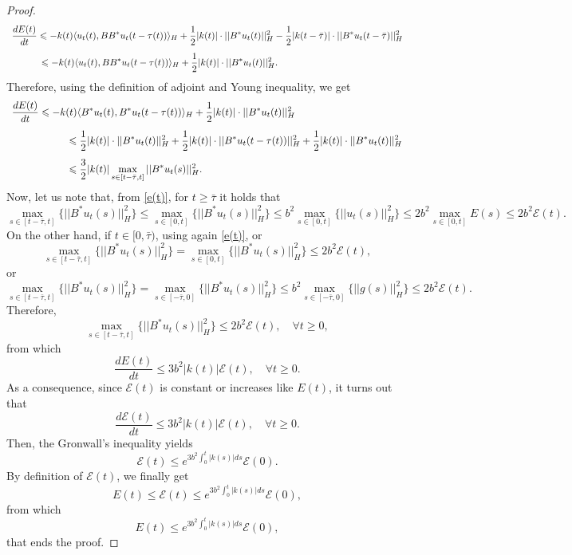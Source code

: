 \documentclass[11pt]{article}
\renewcommand{\geq}{\geqslant}
\renewcommand{\leq}{\leqslant}
\begin{document}
\begin{proof}
$$\begin{array}{l}
		\vspace{0.3cm}\displaystyle{\frac{dE(t)}{dt} \leq -k(t)\langle u_t(t),BB^*u_t(t-\tau(t))\rangle_H +\frac{1}{2}|k(t)| \cdot ||B^*u_t(t)||_H^2-\frac{1}{2}|k(t-\bar{\tau})|\cdot ||B^*u_t(t-\bar\tau)||_H^2}\\
		\displaystyle{\hspace{1.1cm}\leq -k(t)\langle u_t(t),BB^*u_t(t-\tau(t))\rangle_H +\frac{1}{2}|k(t)| \cdot ||B^*u_t(t)||_H^2.}
	\end{array}
	$$
	Therefore, using the definition of adjoint and Young inequality, we get
	$$
	\begin{array}{l}
		\vspace{0.3cm}\displaystyle{
			\frac{dE(t)}{dt}\leq-k(t)\langle B^*u_t(t),B^*u_t(t-\tau(t))\rangle_H +\frac{1}{2}|k(t)| \cdot ||B^*u_t(t)||_H^2}\\
		\vspace{0.3cm}\displaystyle{\hspace{2 cm}\leq \frac{1}{2}|k(t)\vert\cdot||B^*u_t(t)||_H^2 +\frac{1}{2}|k(t)\vert\cdot||B^*u_t(t-\tau(t))||_H^2+\frac{1}{2}|k(t)\vert\cdot||B^*u_t(t)||_H^2}\\
		\displaystyle{\hspace{2cm}\leq \frac{3}{2}|k(t)\vert \max_{s\in [t-\bar{\tau},t]}||B^*u_t(s)||_H^2.}
	\end{array}
	$$
	Now, let us note that, from \eqref{e(t)}, for $t\geq \bar{\tau}$ it holds that
	$$\max_{s\in [t-\bar{\tau},t]}\{||B^*u_t(s)||_H^2\}\leq\max_{s\in [0,t]}\{||B^*u_t(s)||_H^2\}\leq b^2\max_{s\in [0,t]}\{||u_t(s)||_H^2\} \leq  2b^2\max_{s\in [0,t]}E(s)\leq 2 b^2 \mathcal{E}(t).$$
	On the other hand, if $t\in [0,\bar{\tau})$, using again \eqref{e(t)}, or 
	$$\max_{s\in [t-\bar{\tau},t]}\{||B^*u_t(s)||_H^2\}=\max_{s\in [0,t]}\{||B^*u_t(s)||_H^2\}\leq 2 b^2 \mathcal{E}(t),$$
	or 
	$$\max_{s\in [t-\bar{\tau},t]}\{||B^*u_t(s)||_H^2\}=\max_{s\in [-\bar{\tau},0]}\{||B^*u_t(s)||_H^2\}\leq b^2\max_{s\in [-\bar{\tau},0]}\{||g(s)||_H^2\}\leq 2 b^2 \mathcal{E}(t).$$
	Therefore, 
	$$\max_{s\in [t-\bar{\tau},t]}\{||B^*u_t(s)||_H^2\}\leq 2b^2 \mathcal{E}(t),\quad \forall t\geq 0,$$
	from which $$\frac{dE(t)}{dt}\leq 3 b^2|k(t)\vert\mathcal{E}(t),\quad \forall t\geq 0.$$
	As a consequence, since $\mathcal{E}(t)$ is constant or increases like $E(t)$, it turns out that
	$$\frac{d\mathcal{E}(t)}{dt}\leq 3b^2|k(t)\vert\mathcal{E}(t),\quad \forall t\geq 0.$$
	Then, the Gronwall's inequality yields
	$$\mathcal{E}(t)\leq e^{3b^2\int_{0}^{t}|k(s)\vert ds}\mathcal{E}(0).$$
	By definition of $\mathcal{E}(t)$, we finally get
	$$E(t)\leq \mathcal{E}(t)\leq e^{3b^2\int_{0}^{t}|k(s)\vert ds}\mathcal{E}(0),$$
	from which
	$$E(t)\leq  e^{3b^2\int_{0}^{t}|k(s)\vert ds}\mathcal{E}(0),$$
that ends the proof. \end{proof}
\end{document}
